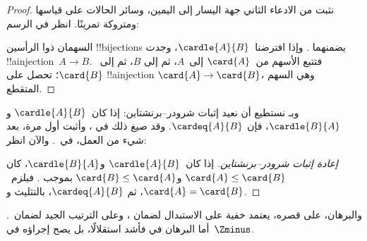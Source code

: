 \documentclass[../../../include/open-logic-section]{subfiles}
\begin{document}
\begin{proof}
نثبت من الادعاء الثاني جهة اليسار إلى اليمين، وسائر الحالات على
قياسها ومتروكة تمرينًا. انظر في الرسم:
\begin{center}
\end{center}
السهمان ذوا الرأسين !!{bijection}s يضمنهما
. وإذا افترضنا~$\cardle{A}{B}$، وجدت
!!a{injection}~$A\to B$. فتتبع الأسهم من~$\card{A}$ إلى~$A$، ثم إلى
$B$، ثم إلى~$\card{B}$؛ تحصل على !!a{injection}
$\card{A} \to \card{B}$، وهي السهم المتقطع.
\end{proof}\noindent
وبـ نستطيع أن نعيد إثبات
شرودر--برنشتاين: إذا كان~$\cardle{A}{B}$ و$\cardle{B}{A}$، فإن
$\cardeq{A}{B}$. وقد صيغ ذلك في
، وأثبت أول مرة، بعد شيء
من العمل، في~. والآن انظر:

\begin{proof}[إعادة إثبات شرودر--برنشتاين]
إذا كان~$\cardle{A}{B}$ و$\cardle{B}{A}$، كان
$\card{A} \leq \card{B}$ و$\card{B} \leq \card{A}$ بموجب
. فيلزم~$\card{A} = \card{B}$، ثم
$\cardeq{A}{B}$، بالتثليث و.
\end{proof}
\noindent
والبرهان، على قصره، يعتمد خفية على الاستبدال لضمان
، وعلى الترتيب
الجيد لضمان~. أما البرهان في
 فأشد استقلالًا، بل يصح إجراؤه
في~$\Zminus$.
\end{document}
